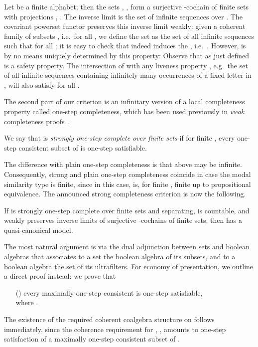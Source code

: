 \documentclass[proceedings]{stacs}
\theoremstyle{definition}
\theoremstyle{plain}
\begin{document}
\begin{exa}\label{exa:cochains}
  Let  be a finite alphabet; then the sets , , form
  a surjective -cochain of finite sets with projections
  , . The inverse limit  is the set
   of infinite sequences over . The covariant powerset
  functor  preserves this inverse limit weakly: given a coherent
  family of subsets , i.e.\  for
  all , we define the set  as the set of all
  infinite sequences  such that  for all ; it is easy to check that indeed  induces the
  , i.e.\ . However,  is by no means uniquely
  determined by this property: Observe that  as just defined is a
  safety property. The intersection of  with any liveness property
  , e.g.\ the set  of all infinite sequences containing
  infinitely many occurrences of a fixed letter in , will also
  satisfy  for all .
\end{exa}
\noindent The second part of our criterion is an infinitary version of
a local completeness property called one-step completeness, which has
been used previously in \emph{weak} completeness
proofs~\cite{Pattinson03,Schroder07}.
\begin{defi}
  We say that  is \emph{strongly one-step complete over finite
    sets} if for finite , every one-step consistent subset 
  of  is one-step satisfiable.
\end{defi}
\noindent 
The difference with plain one-step completeness is that  above
may be infinite. Consequently, strong and plain one-step completeness
coincide in case the modal similarity type  is finite, since
in this case,  is, for finite , finite up
to propositional equivalence. The announced strong completeness
criterion is now the following.
\begin{thm}\label{thm:can-model}
  If  is strongly one-step complete over finite sets and
  separating,  is countable, and  weakly preserves inverse
  limits of surjective -cochains of finite sets, then 
  has a quasi-canonical model.
\end{thm}
  The most natural argument is via the dual adjunction between sets
  and boolean algebras that associates to a set the boolean algebra of
  its subsets, and to a boolean algebra the set of its
  ultrafilters. For economy of presentation, we outline a direct
  proof instead: we prove that
  \begin{itemize}
  \item[()] every maximally one-step consistent
     is one-step satisfiable,\\ where
    .
  \end{itemize}
  The existence of the required coherent coalgebra structure 
  on  follows immediately, since the coherence requirement for
  , , amounts to one-step satisfaction of
  a maximally one-step consistent subset of . 
\end{document}
